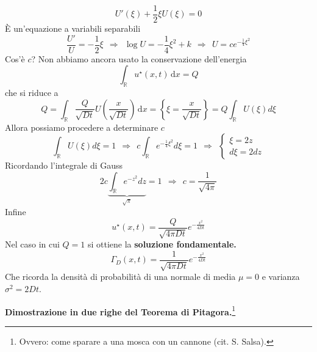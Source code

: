 \documentclass[10pt,a4paper,twoside,openright]{book}
\newcommand{\de}{\,\mathrm d}
\newcommand{\dx}{\de x}
\begin{document}
\begin{equation*}
    U'(\xi) +\frac{1}{2} \xi U(\xi) =0
\end{equation*}
È un'equazione a variabili separabili
\begin{equation*}
    \frac{U'}{U} =-\frac{1}{2} \xi \ \ \Rightarrow \ \ \log U=-\frac{1}{4} \xi ^{2} +k\ \ \Rightarrow \ \ U=ce^{-\frac{1}{4} \xi ^{2}}
\end{equation*}
Cos'è $c$? Non abbiamo ancora usato la conservazione dell'energia
\begin{equation*}
    \int _{\mathbb{R}} u^{\star }(x,t) \dx=Q
\end{equation*}
che si riduce a
\begin{equation*}
    Q = \int _{\mathbb{R}}\frac{Q}{\sqrt{Dt}} U\left(\frac{x}{\sqrt{Dt}}\right) \dx=\left\{\xi=\frac{x}{\sqrt{Dt}}\right\} = Q\int _{\mathbb{R}} U(\xi) d\xi
\end{equation*}
Allora possiamo procedere a determinare $c$
\begin{equation*}
    \int _{\mathbb{R}} U(\xi) d\xi =1\ \ \Rightarrow \ \ c\int _{\mathbb{R}} e^{-\frac{1}{4} \xi ^{2}} d\xi =1\ \ \Rightarrow \ \ \begin{cases}
        \xi =2z \\
        d\xi =2dz
    \end{cases}
\end{equation*}
Ricordando l'integrale di Gauss
\begin{equation*}
    2c\underbrace{\int _{\mathbb{R}} e^{-z^{2}} dz}_{\sqrt{\pi }} =1\ \ \Rightarrow \ \ c=\frac{1}{\sqrt{4\pi }}
\end{equation*}
Infine
\begin{equation*}
    \boxed{u^{\star }(x,t) =\frac{Q}{\sqrt{4\pi Dt}} e^{-\frac{x^{2}}{4Dt}}}
\end{equation*}
Nel caso in cui $Q=1$ si ottiene la \textbf{soluzione fondamentale.}
\begin{equation*}
    \boxed{\Gamma _{D}(x,t) =\frac{1}{\sqrt{4\pi Dt}} e^{-\frac{x^{2}}{4Dt}}}
\end{equation*}
Che ricorda la densità di probabilità di una normale di media $\mu=0$ e varianza $\sigma ^2 =2Dt$.

\textbf{Dimostrazione in due righe del Teorema di Pitagora.}\footnote{Ovvero: come sparare a una mosca con un cannone (cit. S. Salsa).}
\end{document}
